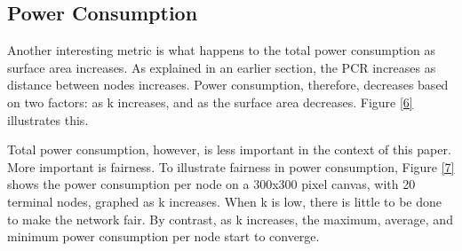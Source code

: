 \subsection{Power Consumption}

Another interesting metric is what happens to the total power consumption as surface area increases.  As explained in an earlier section, the PCR increases as distance between nodes increases.  Power consumption, therefore, decreases based on two factors: as k increases, and as the surface area decreases.  Figure \ref{6} illustrates this. 

Total power consumption, however, is less important in the context of this paper.  More important is fairness.  To illustrate fairness in power consumption, Figure \ref{7} shows the power consumption per node on a 300x300 pixel canvas, with 20 terminal nodes, graphed as k increases.  When k is low, there is little to be done to make the network fair.  By contrast, as k increases, the maximum, average, and minimum power consumption per node start to converge. 

